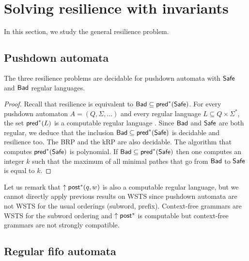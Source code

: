 

\section{Solving resilience with invariants}

In this section, we study the general resilience problem.

\subsection{Pushdown automata}


\begin{theorem}
The three {\sc resilience} problems are decidable for pushdown automata with $\textsf{Safe}$ and $\textsf{Bad}$ regular languages.
\end{theorem}

\begin{proof}
Recall that resilience is equivalent to  $\textsf{Bad} \subseteq \textsf{pred}^*(\textsf{Safe})$. For every pushdown automaton $A=(Q,\Sigma,...)$ and every regular language $L \subseteq Q \times \Sigma^*$, the set $\textsf{pred}^*(L)$ is a computable regular language \cite{DBLP:journals/ipl/BouajjaniEFMRWW00}. Since $\textsf{Bad}$ and $\textsf{Safe}$ are both regular, we deduce that
%
 the inclusion $\textsf{Bad} \subseteq \textsf{pred}^*(\textsf{Safe})$ is decidable and resilience too.
%
The BRP and the kRP are also decidable. The algorithm that computes $ \textsf{pred}^*(\textsf{Safe})$ is polynomial. If $\textsf{Bad} \subseteq \textsf{pred}^*(\textsf{Safe})$ then one computes an integer $k$ such that the maximum of all minimal pathes that go from $\textsf{Bad}$ to $\textsf{Safe}$ is equal to $k$.
%
\end{proof}
%
Let us remark that $\uparrow \textsf{post}^*(q,w)$ is also a computable regular language, but we cannot directly apply previous results on WSTS since pushdown automata are not WSTS for the usual orderings (subword, prefix).
Context-free grammars are WSTS \cite{DBLP:journals/tcs/FinkelS01} for the subword ordering and $\uparrow \textsf{post}^*$ is computable but context-free grammars are not strongly compatible.


%
%



\subsection{Regular fifo automata}

